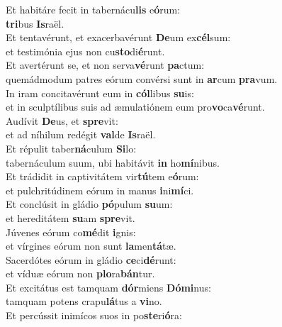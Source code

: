 \oddverse Et habitáre fecit in tabernácu\textbf{lis} e\textbf{ó}rum:~\*\\
\oddverse \textbf{tri}bus \textbf{Is}raël.\\
\evenverse Et tentavérunt, et exacerbavérunt \textbf{De}um ex\textbf{cél}sum:~\*\\
\evenverse et testimónia ejus non cu\textbf{sto}di\textbf{é}runt.\\
\oddverse Et avertérunt se, et non serva\textbf{vé}runt \textbf{pa}ctum:~\*\\
\oddverse quemádmodum patres eórum convérsi sunt in \textbf{ar}cum \textbf{pra}vum.\\
\evenverse In iram concitavérunt eum in \textbf{cól}libus \textbf{su}is:~\*\\
\evenverse et in sculptílibus suis ad æmulatiónem eum pro\textbf{vo}ca\textbf{vé}runt.\\
\oddverse Audívit \textbf{De}us, et \textbf{spre}vit:~\*\\
\oddverse et ad níhilum redégit \textbf{val}de \textbf{Is}raël.\\
\evenverse Et répulit taber\textbf{ná}culum \textbf{Si}lo:~\*\\
\evenverse tabernáculum suum, ubi habitávit \textbf{in} ho\textbf{mí}nibus.\\
\oddverse Et trádidit in captivitátem vir\textbf{tú}tem e\textbf{ó}rum:~\*\\
\oddverse et pulchritúdinem eórum in manus \textbf{i}ni\textbf{mí}ci.\\
\evenverse Et conclúsit in gládio \textbf{pó}pulum \textbf{su}um:~\*\\
\evenverse et hereditátem \textbf{su}am \textbf{spre}vit.\\
\oddverse Júvenes eórum co\textbf{mé}dit \textbf{i}gnis:~\*\\
\oddverse et vírgines eórum non sunt \textbf{la}men\textbf{tá}tæ.\\
\evenverse Sacerdótes eórum in gládio \textbf{ce}ci\textbf{dé}runt:~\*\\
\evenverse et víduæ eórum non \textbf{plo}ra\textbf{bán}tur.\\
\oddverse Et excitátus est tamquam \textbf{dór}miens \textbf{Dó}\textbf{mi}nus:~\*\\
\oddverse tamquam potens crapu\textbf{lá}tus a \textbf{vi}no.\\
\evenverse Et percússit inimícos suos in po\textbf{ste}ri\textbf{ó}ra:~\*\\
